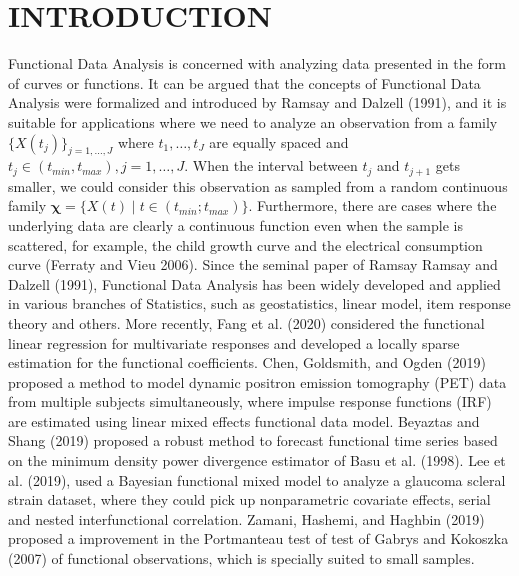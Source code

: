 \documentclass[12pt,]{article}
\theoremstyle{definition}
\theoremstyle{definition}
\theoremstyle{definition}
\theoremstyle{remark}
\begin{document}
\hypertarget{introduction}{%
\section{INTRODUCTION}\label{introduction}}

Functional Data Analysis is concerned with analyzing data presented in the form of curves or functions. It can be argued that the concepts of Functional Data Analysis were formalized and introduced
by Ramsay and Dalzell (1991), and it is suitable for applications where we need to analyze an observation from a family \(\{X(t_j)\}_{j=1, \dots, J}\) where \(t_1, \dots, t_J\) are equally spaced and \(t_j \in (t_{min}, t_{max}), j=1, \dots, J\). When the interval between \(t_j\) and \(t_{j+1}\) gets smaller, we could consider this observation as sampled from a random continuous family \(\bm{\chi} = \{X(t) \mid t \in (t_{min}; t_{max}) \}\).
Furthermore, there are cases where the underlying data are clearly a continuous function even when the sample is scattered, for example, the child growth curve and the
electrical consumption curve (Ferraty and Vieu 2006).
Since the seminal paper of Ramsay Ramsay and Dalzell (1991),
Functional Data Analysis has been widely developed and applied in various branches of Statistics, such as geostatistics, linear model, item response theory and others. More recently, Fang et al. (2020) considered the functional linear regression for multivariate responses and developed a locally sparse estimation for the functional coefficients. Chen, Goldsmith, and Ogden (2019) proposed a method to model dynamic positron emission tomography (PET) data from multiple subjects simultaneously, where impulse response functions (IRF) are estimated using linear mixed effects functional data model. Beyaztas and Shang (2019) proposed a robust method to forecast functional time series based on the minimum density power divergence estimator of Basu et al. (1998). Lee et al. (2019), used a Bayesian functional mixed model to analyze a glaucoma scleral strain dataset, where they could pick up nonparametric covariate effects, serial and nested interfunctional correlation. Zamani, Hashemi, and Haghbin (2019) proposed a improvement in the Portmanteau test of test of Gabrys and Kokoszka (2007) of functional observations, which is specially suited to small samples.
\end{document}
